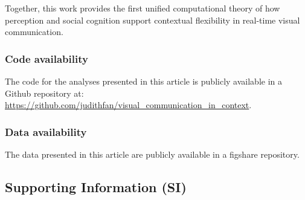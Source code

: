 \documentclass[9pt,twocolumn,twoside]{pnas-new}
\begin{document}





Together, this work provides the first unified computational theory of how perception and social cognition support contextual flexibility in real-time visual communication.

\subsubsection*{Code availability} The code for the analyses presented in this article is publicly available in a Github repository at: \url{https://github.com/judithfan/visual_communication_in_context}.

\subsubsection*{Data availability} The data presented in this article are publicly available in a figshare repository.

\subsection*{Supporting Information (SI)}

\end{document}
